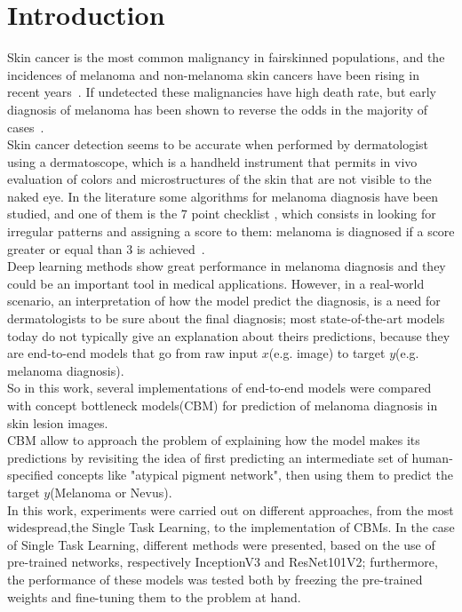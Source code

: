 \graphicspath{{chapters/chapter1/}}
\chapter{Introduction} \label{introduction}
Skin cancer is the most common malignancy in fairskinned populations, and the incidences of melanoma and non-melanoma skin cancers have been rising in recent years~\cite{7ptCNNforMel}. If undetected these malignancies have high death rate, but early diagnosis of melanoma has been shown to reverse the odds in the majority of cases~\cite{mtl7ptCoppola}. \\
Skin cancer detection seems to be accurate when performed by dermatologist using a dermatoscope, which is a handheld instrument that permits in vivo evaluation of colors and microstructures of the skin that are not visible to the naked eye. In the literature some algorithms for melanoma diagnosis have been studied, and one of them is the 7 point checklist \cite{Kawahara}, which consists in looking for irregular patterns and assigning a score to them: melanoma is diagnosed if a score greater or equal than 3 is achieved~\cite{Kawahara}. \\
Deep learning methods show great performance in melanoma diagnosis and they could be an important tool in medical applications. However, in a real-world scenario, an interpretation of how the model predict the diagnosis, is a need for dermatologists to be sure about the final diagnosis; most state-of-the-art models today do not typically give an explanation about theirs predictions, because they are end-to-end models that go from raw input $x$(e.g. image) to target $y$(e.g. melanoma diagnosis).\\
So in this work, several implementations of end-to-end models were compared with concept bottleneck models(CBM)\cite{CBM} for prediction of melanoma diagnosis in skin lesion images. \\
CBM allow to approach the problem of explaining how the model makes its predictions by revisiting the idea of first predicting an intermediate set of human-specified concepts like "atypical pigment network", then using them to predict the target $y$(Melanoma or Nevus). \\
In this work, experiments were carried out on different approaches, from the most widespread,the Single Task Learning, to the implementation of CBMs.
In the case of Single Task Learning, different methods were presented, based on the use of pre-trained networks, respectively InceptionV3\cite{IncNet} and ResNet101V2\cite{Resnet}; furthermore, the performance of these models was tested both by freezing the pre-trained weights and fine-tuning them to the problem at hand.
